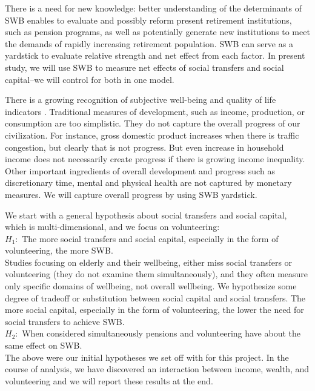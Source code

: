 \documentclass[10pt, letterpaper]{article}
\begin{document}
\begin{spacing}{1.4}
There is a need for new knowledge: better understanding of the determinants of
SWB enables to evaluate and possibly reform present retirement
institutions, such as pension programs, as well
as potentially generate new institutions to meet the demands of rapidly
increasing retirement population. SWB can serve as a yardstick to evaluate
relative strength and net effect from each factor. In present study, we will use SWB
to measure net effects of social transfers and social capital--we will control
for both in one model.

There is a growing recognition of subjective  well-being and quality of life
indicators \citep{aok_lsPol16}. Traditional
measures of development, such as income, production, or consumption are too
simplistic. They do not capture the overall progress of our civilization. For
instance, gross domestic product increases when there is traffic congestion, but
clearly that is not 
progress. But even increase in household income does not necessarily
 create progress if there is growing income inequality. 
Other important ingredients of overall development and progress such as
discretionary time, mental and physical health are not captured by monetary measures. We will
capture overall progress by using SWB yardstick.

%
 We start with a general hypothesis about social
 transfers and social capital, which is multi-dimensional, and we focus  on volunteering:\\
\noindent$H_1:$ The more social transfers and social capital, especially in the
form of volunteering, the more SWB.\\

Studies focusing on elderly and their wellbeing, either miss social
transfers or volunteering (they do not examine them simultaneously), and they
often measure only specific domains of wellbeing, not overall wellbeing. We
hypothesize some degree of tradeoff or substitution between social capital and
social transfers. The more social capital, especially in the form of volunteering,
the lower the need for social transfers to achieve SWB.\\ 

\noindent$H_2:$ When considered simultaneously pensions and volunteering have about the same effect on SWB.\\ 

The above were our initial hypotheses we set off with for this project. In the
course of analysis, we have discovered an interaction between income, wealth, and
volunteering and we will report these results at the end. 


\end{spacing}
\end{document}
